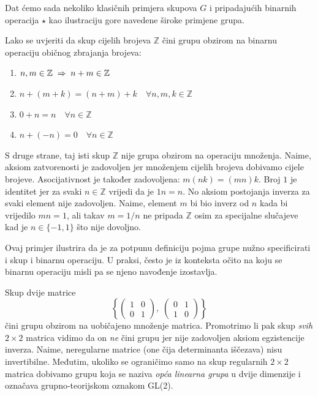 Dat ćemo sada nekoliko klasičnih primjera skupova $G$ i pripadajućih
binarnih operacija $\star$ kao ilustraciju gore navedene široke primjene grupa.

\begin{primjer}[$\mathbb{Z}$, +]
 Lako se uvjeriti da skup cijelih brojeva $\mathbb{Z}$ 
 čini grupu obzirom
 na binarnu operaciju običnog zbrajanja brojeva:
\begin{enumerate}
\item $n,m \in  \mathbb{Z} \;\Rightarrow\; n+m \in  \mathbb{Z}$
\item $n+(m+k)=(n+m)+k \quad \forall n,m,k \in \mathbb{Z}$
\item $0+n=n \quad \forall n\in\mathbb{Z}$ \quad {}
\item $n+(-n)=0 \quad \forall n\in\mathbb{Z}$  \quad {}
\end{enumerate}
\end{primjer}

\begin{primjer}
S druge strane, taj isti skup $\mathbb{Z}$ nije grupa obzirom na
operaciju množenja. Naime, aksiom zatvorenosti je zadovoljen jer
množenjem cijelih brojeva dobivamo cijele brojeve. Asocijativnost
je također zadovoljena: $m(nk)=(mn)k$. Broj $1$ je identitet jer
za svaki $n\in\mathbb{Z}$ vrijedi da je $1n=n$.
No aksiom postojanja inverza za svaki element nije zadovoljen.
Naime, element $m$ bi bio inverz od $n$ kada bi vrijedilo $mn=1$, ali takav $m=1/n$
ne pripada $\mathbb{Z}$ osim za specijalne slučajeve
kad je $n\in\{-1, 1\}$ što nije dovoljno.
\end{primjer}

Ovaj primjer ilustrira da je za potpunu definiciju pojma grupe nužno
specificirati i skup i binarnu operaciju. U praksi, često je iz konteksta
očito na koju se binarnu operaciju misli pa se njeno navođenje izostavlja.

\begin{primjer}
    \label{th:dvijemat}
Skup dvije matrice
\[\left\{
\begin{pmatrix}
1 & 0 \\ 0 & 1
\end{pmatrix}, \;
\begin{pmatrix}
0 & 1 \\ 1 & 0
\end{pmatrix}
\right\} \]
čini grupu obzirom na uobičajeno množenje matrica. Promotrimo li pak skup
\emph{svih} $2\times2$ matrica vidimo da on \emph{ne} čini grupu jer nije
zadovoljen aksiom egzistencije inverza. Naime, neregularne matrice (one
čija determinanta iščezava) nisu invertibilne. Međutim, ukoliko se
ograničimo samo na skup regularnih  $2\times2$ matrica dobivamo grupu
koja se naziva \emph{opća linearna grupa} u dvije dimenzije i označava
grupno-teorijskom oznakom GL(2).
\end{primjer}

